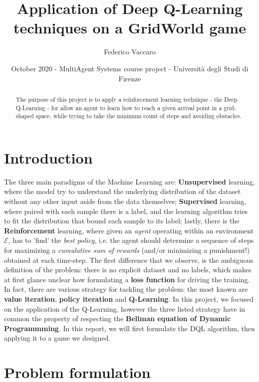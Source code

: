 \documentclass{article}
\title{Application of Deep Q-Learning techniques on a GridWorld game}
\date{October 2020 - MultiAgent Systems course project - Università degli Studi di Firenze}
\author{Federico Vaccaro}
\begin{document}
\maketitle

\begin{abstract}
	The purpose of this project is to apply a reinforcement learning technique - the Deep Q-Learning - for allow an agent to learn how to reach a given arrival point in a grid-shaped space, while trying to take the minimum count of steps and avoiding obstacles.
\end{abstract}


\section{Introduction}

The three main paradigms of the Machine Learning are: \textbf{Unsupervised} learning, where the model try to understand the underlying distribution of the dataset without any other input aside from the data themselves; \textbf{Supervised} learning, where paired with each sample there is a label, and the learning algorithm tries to fit the distribution that bound each sample to its label; lastly, there is the \textbf{Reinforcement} learning, where given an \textit{agent} operating within an environment $\mathcal{E}
$, has to 'find' the \textit{best policy}, i.e. the agent should determine a sequence of steps for maximizing a \textit{cumulative sum of rewards} (and/or minimizing a punishment!) obtained at each time-step. The first difference that we observe, is the ambiguous definition of the problem: there is no explicit dataset and no labels, which makes at first glance unclear how formulating a \textbf{loss function} for driving the training. In fact, there are various strategy for tackling the problem: the most known are \textbf{value iteration}, \textbf{policy iteration} and \textbf{Q-Learning}. In this project, we focused on the application of the Q-Learning, however the three listed strategy have in common the property of respecting the \textbf{Bellman equation of Dynamic Programmming}. In this report, we will first formulate the DQL algorithm, then applying it to a game we designed.

\section{Problem formulation}
\end{document}
